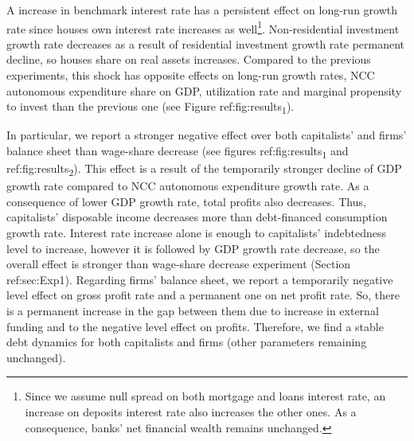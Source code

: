 \documentclass[12pt]{article}
\begin{document}
A increase in benchmark interest rate  has a persistent effect on long-run growth rate since houses own interest rate increases as well\footnote{Since we assume null spread on both mortgage and loans interest rate, an increase on deposits interest rate also increases the other ones. As a consequence, banks' net financial wealth remains unchanged.}.
Non-residential investment growth rate decreases as a result of residential investment growth rate permanent decline, so houses share on real assets increases.
Compared to the previous experiments, this shock has opposite effects on long-run growth rates, NCC autonomous expenditure share on GDP, utilization rate and marginal propensity to invest  than the previous one (see Figure ref:fig:results\textsubscript{1}).


In particular, we report a stronger negative effect over both capitalists' and firms' balance sheet than wage-share decrease (see figures ref:fig:results\textsubscript{1} and ref:fig:results\textsubscript{2}).
This effect is a result of the temporarily stronger decline of GDP growth rate compared to NCC autonomous expenditure growth rate.
As a consequence of lower GDP growth rate, total profits also decreases.
Thus, capitalists' disposable income decreases more than debt-financed consumption growth rate.
Interest rate increase alone is enough to capitalists' indebtedness level to increase, however it is followed by GDP growth rate decrease, so the overall effect is stronger than wage-share decrease experiment (Section ref:sec:Exp1).
Regarding firms' balance sheet, we report a temporarily negative level effect on gross profit rate and a permanent one on net profit rate. 
So, there is a permanent increase in the gap between them due to increase in external funding and to the negative level effect on profits.
Therefore, we find a stable debt dynamics for both capitalists and firms (other parameters remaining unchanged).
\end{document}
